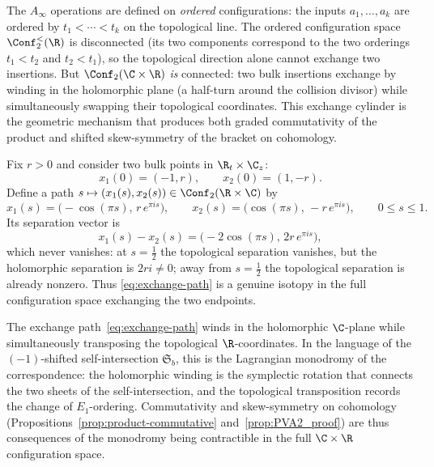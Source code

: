 The $A_\infty$ operations are defined on \emph{ordered} configurations:
the inputs $a_1, \ldots, a_k$ are ordered by $t_1 < \cdots < t_k$
on the topological line. The ordered configuration space
$\Conf_2^{<}(\R)$ is disconnected (its two components correspond
to the two orderings $t_1 < t_2$ and $t_2 < t_1$), so the
topological direction alone cannot exchange two insertions. But
$\Conf_2(\C \times \R)$ \emph{is} connected: two bulk insertions
exchange by winding in the holomorphic plane (a half-turn around the
collision divisor) while simultaneously swapping their topological
coordinates. This exchange cylinder is the geometric mechanism that
produces both graded commutativity of the product and shifted
skew-symmetry of the bracket on cohomology.

\begin{construction}
\label{const:exchange-cylinder}
Fix $r>0$ and consider two bulk points in $\R_t\times\C_z$:
\[
x_1(0)=(-1,r),\qquad x_2(0)=(1,-r).
\]
Define a path $s\mapsto (x_1(s),x_2(s))\in \Conf_2(\R\times\C)$ by
\begin{equation}
\label{eq:exchange-path}
x_1(s)=\bigl(-\cos(\pi s),\,r\,e^{\pi i s}\bigr),
\qquad
x_2(s)=\bigl(\cos(\pi s),\,-r\,e^{\pi i s}\bigr),
\qquad 0\le s\le1.
\end{equation}
Its separation vector is
\[
x_1(s)-x_2(s)=\bigl(-2\cos(\pi s),\,2r\,e^{\pi i s}\bigr),
\]
which never vanishes: at $s=\tfrac12$ the topological separation vanishes, but the
holomorphic separation is $2ri\neq0$; away from $s=\tfrac12$ the topological separation
is already nonzero. Thus \eqref{eq:exchange-path} is a genuine isotopy in the full
configuration space exchanging the two endpoints.
\end{construction}

\begin{remark}
\label{rem:exchange-symplectic-rotation}
The exchange path~\eqref{eq:exchange-path} winds in the holomorphic $\C$-plane
while simultaneously transposing the topological $\R$-coordinates. In the
language of the $(-1)$-shifted self-intersection $\mathfrak{S}_b$, this is
the Lagrangian monodromy of the correspondence: the holomorphic winding
is the symplectic rotation that connects the two sheets of the
self-intersection, and the topological transposition records the change
of $E_1$-ordering. Commutativity and skew-symmetry on cohomology
(Propositions~\ref{prop:product-commutative} and~\ref{prop:PVA2_proof}) are
thus consequences of the monodromy being contractible in the full
$\C\times\R$ configuration space.
\end{remark}

